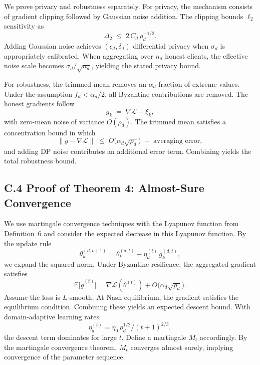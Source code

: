 \documentclass[12pt,a4paper]{article}
\theoremstyle{definition}
\begin{document}
\begingroup
\setlength{\emergencystretch}{2em}

We prove privacy and robustness separately. For privacy, the mechanism consists of gradient clipping followed by Gaussian noise addition. The clipping bounds \(\ell_2\) sensitivity as
\[
\Delta_{2}\;\le\;2\,C_d\,\rho_d^{-1/2}.
\]
Adding Gaussian noise achieves \((\epsilon_d,\delta_d)\) differential privacy when \(\sigma_d\) is appropriately calibrated. When aggregating over \(n_d\) honest clients, the effective noise scale becomes \(\sigma_d/\sqrt{n_d}\), yielding the stated privacy bound.

For robustness, the trimmed mean removes an \(\alpha_d\) fraction of extreme values. Under the assumption \(f_d < \alpha_d/2\), all Byzantine contributions are removed. The honest gradients follow
\[
g_k \;=\; \nabla \mathcal{L} + \xi_k,
\]
with zero-mean noise of variance \(O(\rho_d)\). The trimmed mean satisfies a concentration bound in which
\[
\big\|\overline{g}-\nabla \mathcal{L}\big\|
\;\le\; O\!\big(\alpha_d \sqrt{\rho_d}\big)\;+\;\text{averaging error},
\]
and adding DP noise contributes an additional error term. Combining yields the total robustness bound.

\endgroup

\subsection{C.4 Proof of Theorem 4: Almost-Sure Convergence}

\begingroup
\setlength{\emergencystretch}{2em}

We use martingale convergence techniques with the Lyapunov function from Definition~6 and consider the expected decrease in this Lyapunov function. By the update rule
\[
\theta_{k}^{(d,t+1)}=\theta_{k}^{(d,t)}-\eta_{d}^{(t)}\,g_{k}^{(d,t)},
\]
we expand the squared norm. Under Byzantine resilience, the aggregated gradient satisfies
\[
\mathbb{E}\big[\tilde g^{(t)}\big]
= \nabla \mathcal{L}\!\left(\theta^{(t)}\right)
+ O\!\big(\alpha_{d}\sqrt{\rho_{d}}\big).
\]
Assume the loss is \(L\)-smooth. At Nash equilibrium, the gradient satisfies the equilibrium condition. Combining these yields an expected descent bound. With domain-adaptive learning rates
\[
\eta_{d}^{(t)}=\eta_{0}\,\rho_{d}^{1/2}/(t+1)^{2/3},
\]
the descent term dominates for large \(t\). Define a martingale \(M_{t}\) accordingly. By the martingale convergence theorem, \(M_{t}\) converges almost surely, implying convergence of the parameter sequence.
\end{document}
